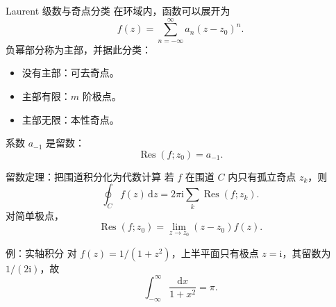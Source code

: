\begin{frame}{Laurent 级数与奇点分类}
  在环域内，函数可以展开为
  \[
    f(z)=\sum_{n=-\infty}^{\infty}a_n(z-z_0)^n.
  \]
  负幂部分称为主部，并据此分类：
  \begin{itemize}
    \item 没有主部：可去奇点。
    \item 主部有限：$m$ 阶极点。
    \item 主部无限：本性奇点。
  \end{itemize}
  系数 $a_{-1}$ 是留数：
  \[
    \operatorname{Res}(f;z_0)=a_{-1}.
  \]
\end{frame}

\begin{frame}{留数定理：把围道积分化为代数计算}
  若 $f$ 在围道 $C$ 内只有孤立奇点 $z_k$，则
  \[
    \oint_C f(z)\,\mathrm{d}z
    =2\pi\mathrm{i}\sum_k\operatorname{Res}(f;z_k).
  \]
  对简单极点，
  \[
    \operatorname{Res}(f;z_0)=\lim_{z\to z_0}(z-z_0)f(z).
  \]
  \begin{block}{例：实轴积分}
    对 $f(z)=1/(1+z^2)$，上半平面只有极点 $z=\mathrm{i}$，其留数为 $1/(2\mathrm{i})$，故
    \[
      \int_{-\infty}^{\infty}\frac{\mathrm{d}x}{1+x^2}=\pi.
    \]
  \end{block}
\end{frame}
